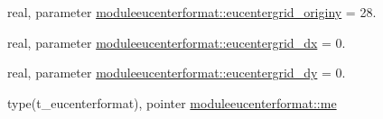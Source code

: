 \begin{DoxyCompactItemize}
\item 
real, parameter \mbox{\hyperlink{namespacemoduleeucenterformat_a0778dd1978cdcbf2440b4aa474a4fc92}{moduleeucenterformat\+::eucentergrid\+\_\+originy}} = 28.
\item 
real, parameter \mbox{\hyperlink{namespacemoduleeucenterformat_a1c74f962a44ee07106d22d1e98574c70}{moduleeucenterformat\+::eucentergrid\+\_\+dx}} = 0.
\item 
real, parameter \mbox{\hyperlink{namespacemoduleeucenterformat_a6a30a645063a9c1400529d6c9dacd3ee}{moduleeucenterformat\+::eucentergrid\+\_\+dy}} = 0.
\item 
type(t\+\_\+eucenterformat), pointer \mbox{\hyperlink{namespacemoduleeucenterformat_a0cbd535d243404d937ef121278618692}{moduleeucenterformat\+::me}}
\end{DoxyCompactItemize}
